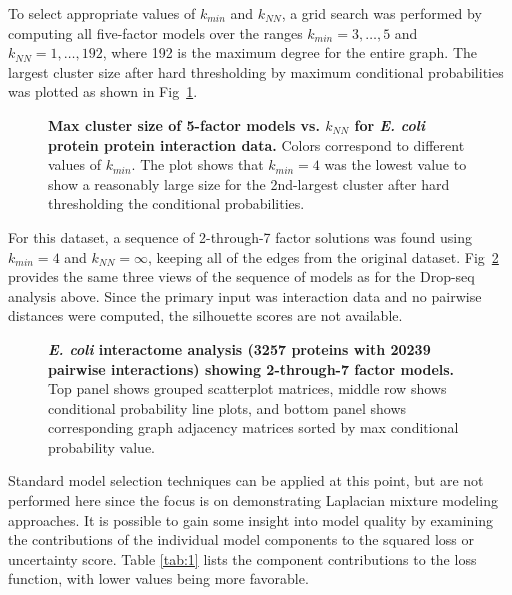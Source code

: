 \documentclass[10pt,letterpaper]{article}
\begin{document}
To select appropriate values of $k_{min}$ and $k_{NN}$, a grid search was performed by computing all five-factor models over the ranges $k_{min}=3, \dots, 5$ and $k_{NN} = 1, \dots, 192$, where 192 is the maximum degree for the entire graph.
The largest cluster size after hard thresholding by maximum conditional probabilities was plotted as shown in Fig~\ref{fig:6}.
\begin{figure}[!h]
\caption{
{\bf Max cluster size of 5-factor models vs. $k_{NN}$ for \emph{E. coli} protein protein interaction data.}
Colors correspond to different values of $k_{min}$.
The plot shows that $k_{min}=4$ was the lowest value to show a reasonably large size for the 2nd-largest cluster after hard thresholding the conditional probabilities.
}
\label{fig:6}
\end{figure}
For this dataset, a sequence of 2-through-7 factor solutions was found using $k_{min}=4$ and $k_{NN}=\infty$, keeping all of the edges from the original dataset.
Fig~\ref{fig:7} provides the same three views of the sequence of models as for the Drop-seq analysis above.
Since the primary input was interaction data and no pairwise distances were computed, the silhouette scores are not available.
\begin{figure}[!h]
\caption{
{\bf \emph{E. coli} interactome analysis (3257 proteins with 20239 pairwise interactions) showing 2-through-7 factor models.}
Top panel shows grouped scatterplot matrices, middle row shows conditional probability line plots, and bottom panel shows corresponding graph adjacency matrices sorted by max conditional probability value.
}
\label{fig:7}
\end{figure}
Standard model selection techniques can be applied at this point, but are not performed here since the focus is on demonstrating Laplacian mixture modeling approaches.
It is possible to gain some insight into model quality by examining the contributions of the individual model components to the squared loss or uncertainty score.
Table \ref{tab:1} lists the component contributions to the loss function, with lower values being more favorable.
\end{document}
